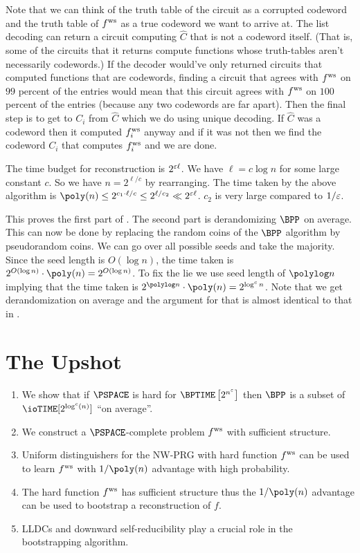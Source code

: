 Note that we can think of the truth table of the circuit as a corrupted codeword and the truth table of $ f^{\text{ws}} $ as a true codeword we want to arrive at. The list decoding can return a circuit computing $\hat{C}$ that is not a codeword itself. (That is, some of the circuits that it returns compute functions whose truth-tables aren't necessarily codewords.) If the decoder would've only returned circuits that computed functions that are codewords, finding a circuit that agrees with $ f^{\text{ws}} $ on $99$ percent of the entries would mean that this circuit agrees with $ f^{\text{ws}} $ on $100$ percent of the entries (because any two codewords are far apart). 
Then the final step is to get to $C_i$ from $\hat{C}$ which we do using unique decoding. If $\hat{C}$ was a codeword then it computed $ f^{\text{ws}} _i$ anyway and if it was not then we find the codeword $C_i$ that computes $ f^{\text{ws}} _i$ and we are done.

The time budget for reconstruction is $2^{\varepsilon \ell}$. We have $\ell=c \log n$ for some large constant $c$. So we have $n= 2^{\ell/c}$ by rearranging. The time taken by the above algorithm is $\poly(n) \leq 2^{c_1 \cdot \ell/c} \leq 2^{\ell/c_2} \ll 2^{\eps \ell}$. $c_2$ is very large compared to $1/\varepsilon$. 

This proves the first part of . The second part is derandomizing $\BPP$ on average. This can now be done by replacing the random coins of the $\BPP$ algorithm by pseudorandom coins. We can go over all possible seeds and take the majority. 
Since the seed length is $O(\log n)$, the time taken is $2^{O(\log n)} \cdot \poly(n) = 2^{O(\log n)}$. 
To fix the lie we use seed length of $\polylog n$ implying that the time taken is $2^{\polylog n} \cdot \poly(n) = 2^{\log^c n}$. 
Note that we get derandomization on average and the argument for that is almost identical to that in .


\section*{The Upshot}

\begin{enumerate}
	\item We show that if $\PSPACE$ is hard for $\BPTIME\left[2^{n^\eps}\right]$ then $\BPP$ is a subset of \\$\ioTIME[2^{\log^c(n)}]$ ``on average''.
	\item We construct a $\PSPACE$-complete problem $ f^{\text{ws}} $ with sufficient structure.
	\item Uniform distinguishers for the NW-PRG with hard function $ f^{\text{ws}} $ can be
	used to learn $ f^{\text{ws}} $ with $1/\poly(n)$ advantage with high probability.
	\item The hard function $ f^{\text{ws}} $ has sufficient structure thus the $1/\poly(n)$
	advantage can be used to bootstrap a reconstruction of $f$.
	\item LLDCs and downward self-reducibility play a crucial role in the
	bootstrapping algorithm.
\end{enumerate}
